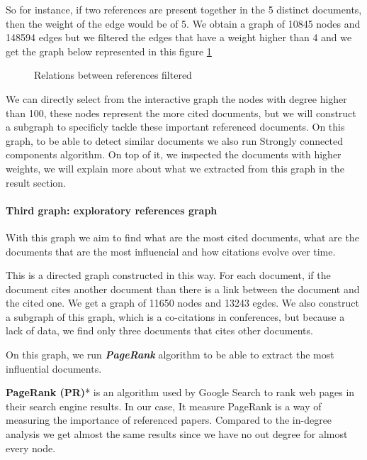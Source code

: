 \documentclass[article,twocolumn]{IEEEtran}
\begin{document}
So for instance, if two references are present together in the 5
distinct documents, then the weight of the edge would be of 5. We obtain
a graph of 10845 nodes and 148594 edges but we filtered the edges that
have a weight higher than 4 and we get the graph below represented in
this figure \ref{fig6}




    \begin{figure}
        \begin{center}\end{center}
        \caption{Relations between references filtered}
        \label{fig6}
    \end{figure}
    
    We can directly select from the interactive graph the nodes with degree
higher than 100, these nodes represent the more cited documents, but we
will construct a subgraph to specificly tackle these important
referenced documents. On this graph, to be able to detect similar
documents we also run Strongly connected components algorithm. On top of
it, we inspected the documents with higher weights, we will explain more
about what we extracted from this graph in the result section.

    \hypertarget{third-graph-exploratory-references-graph}{%
\paragraph{Third graph: exploratory references
graph}\label{third-graph-exploratory-references-graph}}

With this graph we aim to find what are the most cited documents, what
are the documents that are the most influencial and how citations evolve
over time.

This is a directed graph constructed in this way. For each document, if
the document cites another document than there is a link between the
document and the cited one. We get a graph of 11650 nodes and 13243
egdes. We also construct a subgraph of this graph, which is a
co-citations in conferences, but because a lack of data, we find only
three documents that cites other documents.

On this graph, we run \textbf{\emph{PageRank}} algorithm to be able to
extract the most influential documents.

\textbf{PageRank (PR)}* is an algorithm used by Google Search to rank
web pages in their search engine results. In our case, It measure
PageRank is a way of measuring the importance of referenced papers.
Compared to the in-degree analysis we get almost the same results since
we have no out degree for almost every node.
\end{document}
